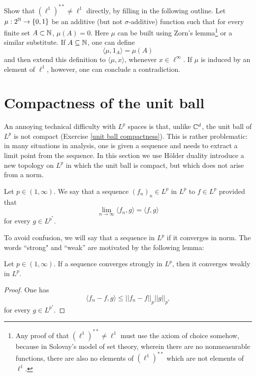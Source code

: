 \begin{exercise}
Show that $(\ell^1)^{**} \neq \ell^1$ directly, by filling in the following outline.
Let $\mu: 2^{\mathbb{N}} \to \{0, 1\}$ be an additive (but not $\sigma$-additive) function such that for every finite set $A \subset \mathbb{N}$, $\mu(A) = 0$.
Here $\mu$ can be built using Zorn's lemma\footnote{Any proof of that $(\ell^1)^{**} \neq \ell^1$ must use the axiom of choice somehow, because in Solovay's model of set theory, wherein there are no nonmeasurable functions, there are also no elements of $(\ell^1)^{**}$ which are not elements of $\ell^1$.} or a similar substitute.
If $A \subseteq \mathbb{N}$, one can define
\[\langle \mu, 1_A\rangle = \mu(A)\]
and then extend this definition to $\langle \mu, x\rangle$, whenever $x \in \ell^\infty$.
If $\mu$ is induced by an element of $\ell^1$, however, one can conclude a contradiction.
\end{exercise}

\section{Compactness of the unit ball}
An annoying technical difficulty with $L^p$ spaces is that, unlike $\mathbb{C}^d$, the unit ball of $L^p$ is not compact (Exercise \ref{unit ball compactness}).
This is rather problematic: in many situations in analysis, one is given a sequence and needs to extract a limit point from the sequence.
In this section we use H\"older duality introduce a new topology on $L^p$ in which the unit ball is compact, but which does not arise from a norm.

\begin{definition}
Let $p \in (1, \infty)$. We say that a sequence $(f_{n})_{n} \in L^p$  in $L^p$ to $f \in L^p$ provided that
\[\lim_{n \to \infty} \langle f_{n}, g\rangle = \langle f, g\rangle\]
for every $g \in L^{p^*}$.
\end{definition}

To avoid confusion, we will say that a sequence  in $L^p$ if it converges in norm.
The words ``strong" and ``weak'' are motivated by the following lemma:

\begin{lemma}
Let $p \in (1, \infty)$. If a sequence converges strongly in $L^p$, then it converges weakly in $L^p$.
\end{lemma}
\begin{proof}
One has
\[\langle f_{n} - f, g \rangle \leq ||f_{n} - f||_{p}  ||g||_{p^*}\]
for every $g \in L^{p^*}$.
\end{proof}

